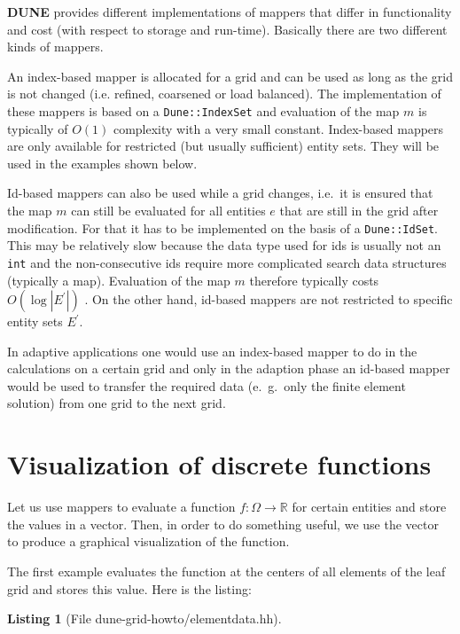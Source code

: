 \documentclass[11pt,a4paper,headinclude,footinclude,DIV16,normalheadings]{scrreprt}
\newcommand{\Dune}{{\sf\bfseries DUNE}\xspace}
\newtheorem{lst}{Listing}
\begin{document}
\Dune{} provides different implementations of mappers that differ in
functionality and cost (with respect to storage and
run-time). Basically there are two different kinds of mappers. 


An index-based mapper is allocated for a grid and can be used as long
as the grid is not changed (i.e. refined, coarsened or load
balanced). The implementation of these mappers is based on a
\lstinline!Dune::IndexSet! and evaluation of the map $m$ is typically
of $O(1)$ complexity with a very small constant. 
Index-based mappers are only available for restricted (but
usually sufficient) entity sets. They will be used in the examples
shown below. 


Id-based mappers can also be used while a grid changes, i.e.~it is
ensured that the map $m$ can still be evaluated for all entities $e$
that are still in the grid after modification. For that it
has to be implemented on the basis of a \lstinline!Dune::IdSet!. This may be
relatively slow because the data type used for ids is usually not an
\lstinline!int! and the non-consecutive ids require more complicated search data
structures (typically a map). Evaluation of the map $m$ therefore
typically costs $O(\log |E^\prime|)$ . On the other hand, id-based
mappers are not restricted to specific entity sets $E^\prime$. 

In adaptive applications one would use an index-based mapper to do in
the calculations on a certain grid and only in the adaption phase an
id-based mapper would be used to transfer the required data
(e.~g.~only the finite element solution) from one grid to the next grid.

\section{Visualization of discrete functions}

Let us use mappers to evaluate a function $f:\Omega\to\mathbb{R}$ for
certain entities and store the values in a vector. Then, in order to
do something useful, we use the vector to produce a graphical
visualization of the function.

The first example evaluates the function at the centers of all
elements of the leaf grid and stores this value. Here is the listing:

\begin{lst}[File dune-grid-howto/elementdata.hh] \mbox{}
\nopagebreak

\end{lst}
\end{document}
